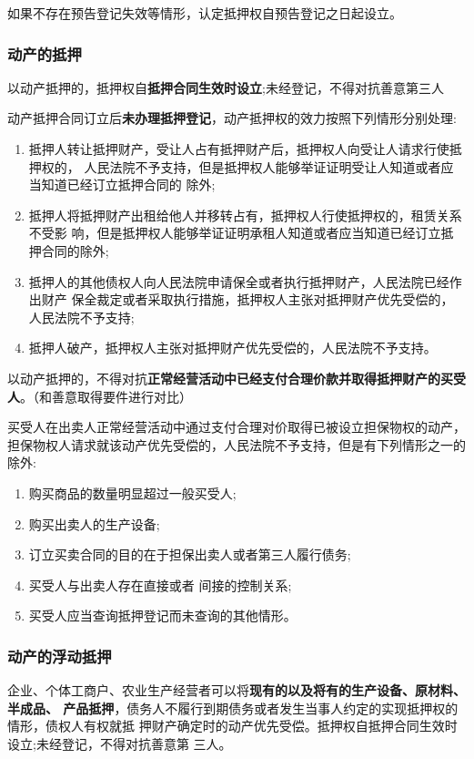 \documentclass[UTF8,12pt]{ctexart}
\numberwithin{equation}{section} %
\numberwithin{figure}{section}
\numberwithin{table}{section}
\begin{document}
	如果不存在预告登记失效等情形，认定抵押权自预告登记之日起设立。
	
	
	\subsubsection{动产的抵押}
	以动产抵押的，抵押权自\textbf{抵押合同生效时设立};未经登记，不得对抗善意第三人
	
	动产抵押合同订立后\textbf{未办理抵押登记}，动产抵押权的效力按照下列情形分别处理:
	\begin{enumerate}
		\item 抵押人转让抵押财产，受让人占有抵押财产后，抵押权人向受让人请求行使抵押权的， 人民法院不予支持，但是抵押权人能够举证证明受让人知道或者应当知道已经订立抵押合同的 除外;
		
		\item 抵押人将抵押财产出租给他人并移转占有，抵押权人行使抵押权的，租赁关系不受影 响，但是抵押权人能够举证证明承租人知道或者应当知道已经订立抵押合同的除外; 
		
		\item 抵押人的其他债权人向人民法院申请保全或者执行抵押财产，人民法院已经作出财产 保全裁定或者采取执行措施，抵押权人主张对抵押财产优先受偿的，人民法院不予支持;
		
		\item 抵押人破产，抵押权人主张对抵押财产优先受偿的，人民法院不予支持。
	\end{enumerate}
	
	
	以动产抵押的，不得对抗\textbf{正常经营活动中已经支付合理价款并取得抵押财产的买受人}。（和善意取得要件进行对比）
	
	 买受人在出卖人正常经营活动中通过支付合理对价取得已被设立担保物权的动产，担保物权人请求就该动产优先受偿的，人民法院不予支持，但是有下列情形之一的 除外:
	 \begin{enumerate}
	 	\item  购买商品的数量明显超过一般买受人;
	 	
	 	\item 购买出卖人的生产设备;
	 	
	 	\item 订立买卖合同的目的在于担保出卖人或者第三人履行债务;
	 	
	 	\item 买受人与出卖人存在直接或者 间接的控制关系;
	 	
	 	\item 买受人应当查询抵押登记而未查询的其他情形。
	 \end{enumerate}
	
	\subsubsection{动产的浮动抵押}
	企业、个体工商户、农业生产经营者可以将\textbf{现有的以及将有的生产设备、原材料、半成品、 产品抵押}，债务人不履行到期债务或者发生当事人约定的实现抵押权的情形，债权人有权就抵 押财产确定时的动产优先受偿。抵押权自抵押合同生效时设立;未经登记，不得对抗善意第 三人。
	
\end{document}
